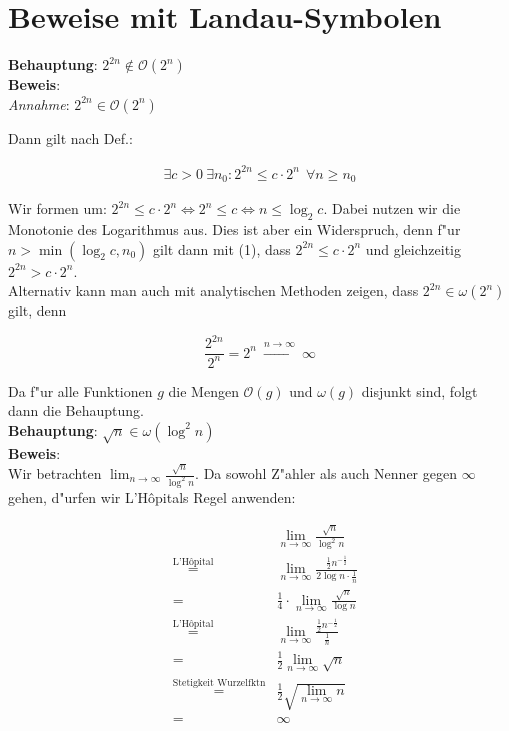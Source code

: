 \documentclass{scrartcl}
\newcommand{\bigO}{\ensuremath{\mathcal{O}}}
\begin{document}
\section{Beweise mit Landau-Symbolen}

\textbf{Behauptung}: $2^{2n} \not \in \bigO(2^n)$ \\
\textbf{Beweis}:   \\

\emph{Annahme}: $2^{2n} \in \bigO(2^n)$

Dann gilt nach Def.:

\begin{align}
\exists c > 0 \ \exists n_0: 2^{2n} \leq c\cdot 2^n \ \ \forall n \geq n_0
\end{align}

Wir formen um: $2^{2n} \leq c\cdot 2^n \iff 2^n \leq c \iff n \leq \log_2 c$. Dabei nutzen wir
die Monotonie des Logarithmus aus. Dies ist aber ein Widerspruch, denn f"ur $n > \min(\log_2 c, n_0)$ gilt
dann mit (1), dass $2^{2n} \leq c\cdot 2^n$ und gleichzeitig $2^{2n} > c\cdot 2^n$.
\\

Alternativ kann man auch mit analytischen Methoden zeigen, dass $2^{2n} \in \omega(2^n)$ gilt, denn

\[ \frac{2^{2n}}{2^n} = 2^n \ \xrightarrow{n \rightarrow \infty} \ \infty \]

Da f"ur alle Funktionen $g$ die Mengen $\bigO(g)$ und $\omega(g)$ disjunkt sind, folgt dann
die Behauptung. \\

\noindent\textbf{Behauptung}: $\sqrt{n} \in \omega(\log^2 n)$ \\
\textbf{Beweis}:   \\

Wir betrachten $\lim_{n \rightarrow \infty} \frac{\sqrt{n}}{\log^2 n}$. Da sowohl Z"ahler als auch
Nenner gegen $\infty$ gehen, d"urfen wir L'H\^{o}pitals Regel anwenden:

\begin{align*}
  &&\lim_{n \rightarrow \infty} \frac{\sqrt{n}}{\log^2 n} \\
  &\overset{\text{L'H\^{o}pital}}{=} &\lim_{n \rightarrow \infty} \frac{\frac{1}{2}n^{-\frac{1}{2}}}{2\log n \cdot \frac{1}{n}} \\
  &= &\frac{1}{4} \cdot \lim_{n \rightarrow \infty} \frac{\sqrt{n}}{\log n} \\
  &\overset{\text{L'H\^{o}pital}}{=} &\lim_{n \rightarrow \infty} \frac{\frac{1}{2}n^{-\frac{1}{2}}}{\frac{1}{n}} \\
  &= &\frac{1}{2}\lim_{n \rightarrow \infty} \sqrt{n} \\
  &\overset{\text{Stetigkeit Wurzelfktn}}{=} &\frac{1}{2}\sqrt{\lim_{n \rightarrow \infty} n} \\
  &=&\infty
\end{align*}
\end{document}
